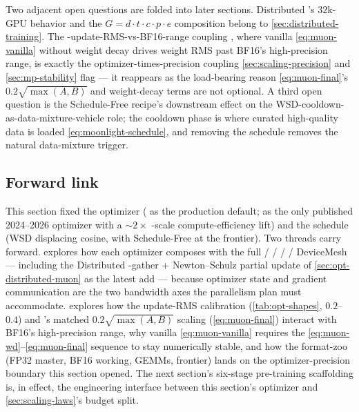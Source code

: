 Two adjacent open questions are folded into later sections.
Distributed 's $32$k-GPU behavior and the $G = d \cdot t \cdot c
\cdot p \cdot e$ composition belong to \cref{sec:distributed-training}.
The -update-RMS-vs-BF16-range coupling
\citep[\S 2.2]{muon-moonlight2025}, where vanilla
\cref{eq:muon-vanilla} without weight decay drives weight RMS past
BF16's high-precision range, is exactly the optimizer-times-precision
coupling \cref{sec:scaling-precision} and \cref{sec:mp-stability}
flag --- it reappears as the load-bearing reason
\cref{eq:muon-final}'s $0.2\sqrt{\max(A, B)}$ and weight-decay terms
are not optional. A third open question is the Schedule-Free
recipe's downstream effect on the WSD-cooldown-as-data-mixture-vehicle
role; the cooldown phase is where curated high-quality data is
loaded \eqref{eq:moonlight-schedule}, and removing the schedule
removes the natural data-mixture trigger.

\subsection{Forward link}
\label{sec:opt-forward}

This section fixed the optimizer ( as the production default;
 as the only published 2024--2026 optimizer with a $\sim 2\times$
-scale compute-efficiency lift) and the schedule (WSD displacing
cosine, with Schedule-Free at the frontier). Two threads carry
forward.  explores how each optimizer
composes with the full  /  /  /  /  DeviceMesh ---
including the Distributed  -gather + Newton--Schulz partial
update of \cref{sec:opt-distributed-muon} as the latest add ---
because optimizer state and gradient communication are the two
bandwidth axes the parallelism plan must accommodate.
 explores how the 
update-RMS calibration (\cref{tab:opt-shapes}, $0.2$--$0.4$) and
's matched $0.2\sqrt{\max(A, B)}$ scaling
(\cref{eq:muon-final}) interact with BF16's high-precision range,
why vanilla \cref{eq:muon-vanilla} requires the
\cref{eq:muon-wd}--\cref{eq:muon-final} sequence to stay numerically
stable, and how the format-zoo (FP32 master, BF16 working, 
GEMMs,  frontier) lands on the optimizer-precision boundary
this section opened. The next section's six-stage pre-training
scaffolding is, in effect, the engineering interface between this
section's optimizer and \cref{sec:scaling-laws}'s budget split.
